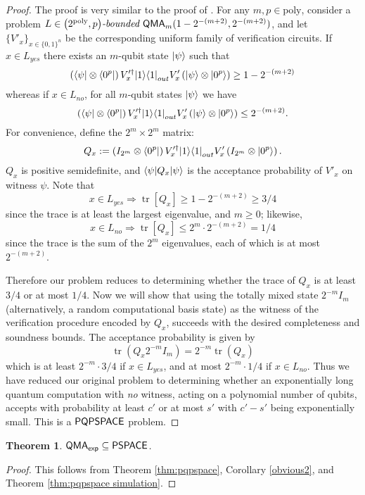 \documentclass[11pt]{article}
\newtheorem{theorem}{Theorem}
\theoremstyle{definition}
\theoremstyle{remark}
\newcommand\QMA{{\sf{QMA}}}
\newcommand\PSPACE{{\sf{PSPACE}}}
\newcommand\QMAexp{{\sf{QMA}_{exp}}}
\newcommand\bddQMA[5]{{\left(#1,#2\right)}\textit{-bounded }\QMA_{#3}(#4,#5)}
\newcommand\PQPSPACE{{\sf{PQPSPACE}}}
\DeclareMathOperator{\tr}{tr}
\newcommand{\poly}{\mathrm{poly}}
\begin{document}
\begin{proof}
The proof is very similar to the proof of \cite[Theorem 3.6]{mw05}. For any $m, p \in\poly$, consider a problem $L\in\bddQMA{2^{\poly}}{p}{m}{1-2^{-(m+2)}}{2^{-(m+2)}}$, and let $\{V'_x\}_{x\in\{0,1\}^n}$ be the corresponding uniform family of verification circuits.
If $x\in L_{yes}$ there exists an $m$-qubit state ${\left\vert{\psi}\right\rangle}$ such that
\begin{equation}
\left({\left\langle{\psi}\right\vert}\otimes {\left\langle{0^p}\right\vert}\right) V'^\dagger_x {\left\vert{1}\right\rangle}{\left\langle{1}\right\vert}_{out} V'_x \left({\left\vert{\psi}\right\rangle}\otimes {\left\vert{0^p}\right\rangle}\right) \ge 1-2^{-(m+2)}
\end{equation}
whereas if $x \in L_{no}$, for all $m$-qubit states ${\left\vert{\psi}\right\rangle}$ we have
\begin{equation}
\left({\left\langle{\psi}\right\vert}\otimes {\left\langle{0^p}\right\vert}\right) V'^\dagger_x {\left\vert{1}\right\rangle}{\left\langle{1}\right\vert}_{out} V'_x \left({\left\vert{\psi}\right\rangle}\otimes {\left\vert{0^p}\right\rangle}\right) \le 2^{-(m+2)}.
\end{equation}
For convenience, define the $2^m \times 2^m$ matrix:
\begin{equation}
Q_x := \left(I_{2^m}\otimes {\left\langle{0^p}\right\vert}\right) V'^\dagger_x {\left\vert{1}\right\rangle}{\left\langle{1}\right\vert}_{out} V'_x \left(I_{2^m}\otimes {\left\vert{0^p}\right\rangle}\right).
\end{equation}
$Q_x$ is positive semidefinite, and ${\left\langle{\psi}\right\vert}Q_x{\left\vert{\psi}\right\rangle}$ is the acceptance probability of $V'_x$ on witness $\psi$.
Note that
\begin{equation}
x\in L_{yes} \Rightarrow \tr[Q_x]\ge 1 - 2^{-(m+2)} \ge 3/4
\end{equation}
since the trace is at least the largest eigenvalue, and $m\geq 0$; likewise,
\begin{equation}
x\in L_{no} \Rightarrow \tr[Q_x]\le 2^m \cdot 2^{-(m+2)} = 1/4
\end{equation}
since the trace is the sum of the $2^m$ eigenvalues, each of which is at most $2^{-(m+2)}$. 

Therefore our problem reduces to determining whether the trace of $Q_x$ is at least $3/4$ or at most $1/4$.  Now we will show that using the totally mixed state $2^{-m}I_m$ (alternatively, a random computational basis state) as the witness of the verification procedure encoded by $Q_x$, succeeds with the desired completeness and soundness bounds.  The acceptance probability is given by
\begin{equation}
\tr(Q_x 2^{-m}I_m) = 2^{-m} \tr(Q_x)
\end{equation}
which is at least $2^{-m} \cdot 3/4$ if $x\in L_{yes}$, and at most $2^{-m} \cdot 1/4$ if $x\in L_{no}$. Thus we have reduced our original problem to determining whether an exponentially long quantum computation with \emph{no} witness, acting on a polynomial number of qubits, accepts with probability at least $c'$ or at most $s'$ with $c' - s'$ being exponentially small. This is a $\PQPSPACE$ problem.

\end{proof}
\begin{theorem}
$\QMAexp\subseteq\PSPACE$.
\end{theorem}
\begin{proof}
This follows from Theorem \ref{thm:pqpspace}, Corollary \ref{obvious2}, and Theorem \ref{thm:pqpspace simulation}.
\end{proof}
\end{document}
